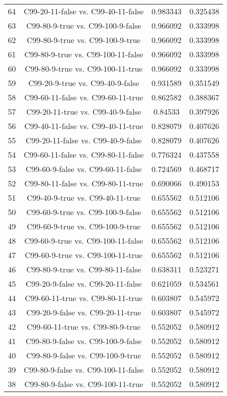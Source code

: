 \documentclass[a4paper,10pt]{article}
\begin{document}
\begin{landscape}
\begin{table}[!htp]
\begin{tabular}{cccc}
64&C99-20-11-false vs. C99-40-11-false&0.983343&0.325438\\
63&C99-80-9-true vs. C99-100-9-false&0.966092&0.333998\\
62&C99-80-9-true vs. C99-100-9-true&0.966092&0.333998\\
61&C99-80-9-true vs. C99-100-11-false&0.966092&0.333998\\
60&C99-80-9-true vs. C99-100-11-true&0.966092&0.333998\\
59&C99-20-9-true vs. C99-40-9-false&0.931589&0.351549\\
58&C99-60-11-false vs. C99-60-11-true&0.862582&0.388367\\
57&C99-20-11-true vs. C99-40-9-false&0.84533&0.397926\\
56&C99-40-11-false vs. C99-40-11-true&0.828079&0.407626\\
55&C99-20-11-false vs. C99-40-9-false&0.828079&0.407626\\
54&C99-60-11-false vs. C99-80-11-false&0.776324&0.437558\\
53&C99-60-9-false vs. C99-60-11-false&0.724569&0.468717\\
52&C99-80-11-false vs. C99-80-11-true&0.690066&0.490153\\
51&C99-40-9-true vs. C99-40-11-true&0.655562&0.512106\\
50&C99-60-9-true vs. C99-100-9-false&0.655562&0.512106\\
49&C99-60-9-true vs. C99-100-9-true&0.655562&0.512106\\
48&C99-60-9-true vs. C99-100-11-false&0.655562&0.512106\\
47&C99-60-9-true vs. C99-100-11-true&0.655562&0.512106\\
46&C99-80-9-true vs. C99-80-11-false&0.638311&0.523271\\
45&C99-20-9-false vs. C99-20-11-false&0.621059&0.534561\\
44&C99-60-11-true vs. C99-80-11-true&0.603807&0.545972\\
43&C99-20-9-false vs. C99-20-11-true&0.603807&0.545972\\
42&C99-60-11-true vs. C99-80-9-true&0.552052&0.580912\\
41&C99-80-9-false vs. C99-100-9-false&0.552052&0.580912\\
40&C99-80-9-false vs. C99-100-9-true&0.552052&0.580912\\
39&C99-80-9-false vs. C99-100-11-false&0.552052&0.580912\\
38&C99-80-9-false vs. C99-100-11-true&0.552052&0.580912\\

\end{tabular}
\end{table}
\end{landscape}
\end{document}
